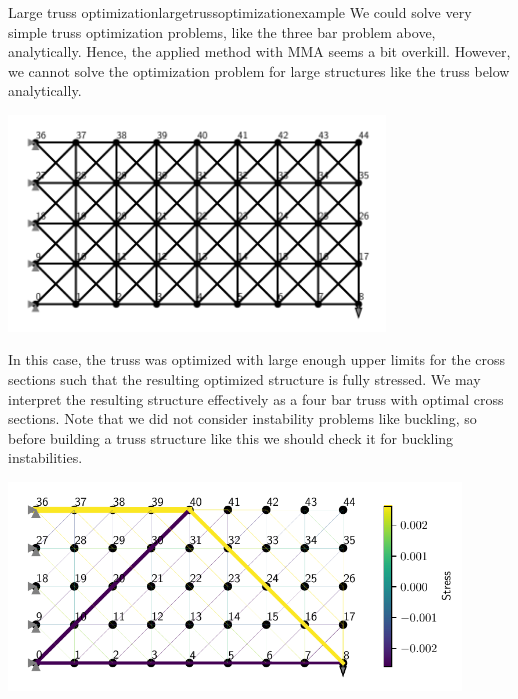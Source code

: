 \begin{example}{Large truss optimization}{largetrussoptimizationexample} 
    We could solve very simple truss optimization problems, like the three bar problem above, analytically. Hence, the applied method with MMA seems a bit overkill. 
    However, we cannot solve the optimization problem for large structures like the truss below analytically. 

    \begin{center}
        \includegraphics[width=0.75\textwidth]{figures/large_truss.pdf} 
    \end{center}

    In this case, the truss was optimized with large enough upper limits for the cross sections such that the resulting optimized structure is fully stressed. We may interpret the resulting structure effectively as a four bar truss with optimal cross sections. Note that we did not consider instability problems like buckling, so before building a truss structure like this we should check it for buckling instabilities.

    \begin{center}
        \includegraphics[width=0.9\textwidth]{figures/large_truss_optimized.pdf} 
    \end{center}
\end{example}



 
